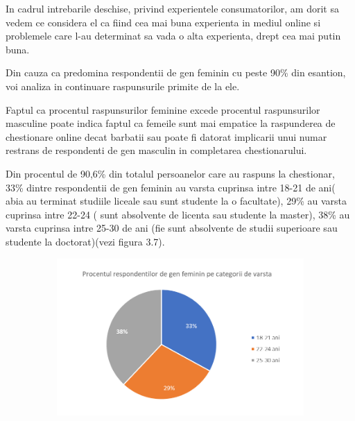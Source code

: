 \documentclass[a4paper, 12pt]{article}
\begin{document}
	\quad In cadrul intrebarile deschise, privind experientele consumatorilor, am dorit sa vedem ce considera  el ca fiind cea mai buna experienta in mediul online si problemele care l-au determinat sa vada o alta experienta, drept cea mai putin buna.
	
	\quad Din cauza ca predomina  respondentii de gen feminin  cu peste 90\% din esantion, voi analiza in continuare raspunsurile primite de la ele.
	
	\quad Faptul ca procentul raspunsurilor feminine excede procentul raspunsurilor masculine poate indica faptul ca femeile sunt mai empatice la raspunderea de chestionare online decat barbatii sau poate fi datorat implicarii unui numar restrans de respondenti de gen masculin in completarea chestionarului.

	\quad Din procentul de 90,6\% din totalul persoanelor care au raspuns la chestionar, 33\% dintre respondentii de gen feminin au varsta cuprinsa intre 18-21 de ani( abia au terminat studiile liceale sau sunt studente la o facultate), 29\% au varsta cuprinsa intre 22-24 ( sunt absolvente de licenta sau studente la master), 38\% au varsta cuprinsa intre 25-30 de ani (fie sunt absolvente de studii superioare sau studente la doctorat)(vezi figura 3.7).
		\begin{figure}[!htb]
		\centering
		\includegraphics[width=12cm, height=6cm]{"figures/ana.png"}
	\end{figure}
	
\end{document}
